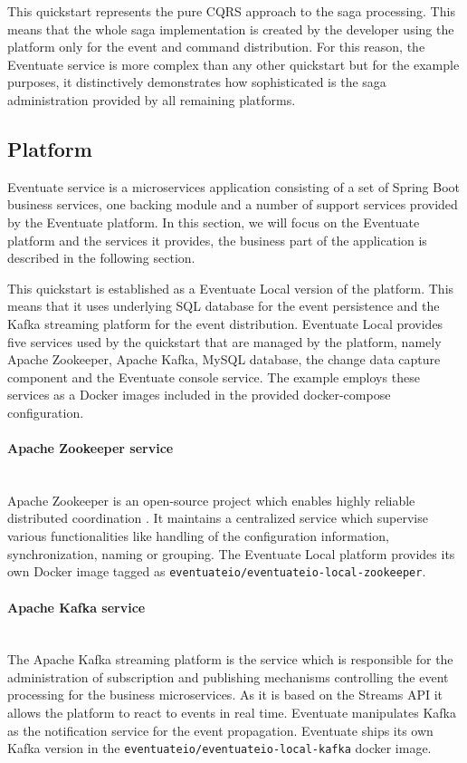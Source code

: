 \documentclass[oneside,
  digital, %
  table,   %
  nolof,     %
  nolot,     %
]{fithesis3}
\newcommand{\newlinepar}[1]{\paragraph{#1}\needspace{4\baselineskip}\mbox{}\\}
\begin{document}
This quickstart represents the pure CQRS approach to the saga processing. This means that the whole saga implementation is created by the developer using the platform only for the event and command distribution. For this reason, the Eventuate service is more complex than any other quickstart but for the example purposes, it distinctively demonstrates how sophisticated is the saga administration provided by all remaining platforms.

\subsection{Platform}
\label{sec:eventuate-platform}

Eventuate service is a microservices application consisting of a set of Spring Boot \cite{spring_boot} business services, one backing module and a number of support services provided by the Eventuate platform. In this section, we will focus on the Eventuate platform and the services it provides, the business part of the application is described in the following section.

This quickstart is established as a Eventuate Local version of the platform. This means that it uses underlying SQL database for the event persistence and the Kafka streaming platform for the event distribution. Eventuate Local provides five services used by the quickstart that are managed by the platform, namely Apache Zookeeper, Apache Kafka, MySQL database, the change data capture component and the Eventuate console service. The example employs these services as a Docker images included in the provided docker-compose configuration.

\newlinepar{Apache Zookeeper service}

Apache Zookeeper is an open-source project which enables highly reliable distributed coordination \cite{apache_zookeeper}. It maintains a centralized service which supervise various functionalities like handling of the configuration information, synchronization, naming or grouping. The Eventuate Local platform provides its own Docker image tagged as \texttt{eventuateio/eventuateio-local-zookeeper}.

\newlinepar{Apache Kafka service}

The Apache Kafka streaming platform is the service which is responsible for the administration of subscription and publishing mechanisms controlling the event processing for the business microservices. As it is based on the Streams API it allows the platform to react to events in real time. Eventuate manipulates Kafka as the notification service for the event propagation. Eventuate ships its own Kafka version in the \texttt{eventuateio/eventuateio-local-kafka} docker image.
\end{document}
